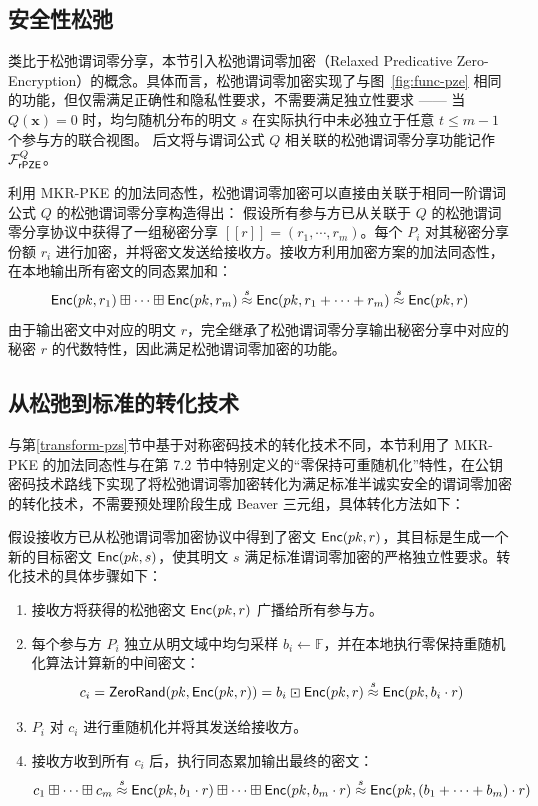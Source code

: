 \subsection{安全性松弛}

类比于松弛谓词零分享，本节引入松弛谓词零加密（Relaxed Predicative Zero-Encryption）的概念。具体而言，松弛谓词零加密实现了与图~\ref{fig:func-pze} 相同的功能，但仅需满足正确性和隐私性要求，不需要满足独立性要求 —— 当 $Q(\textbf{x}) = 0$ 时，均匀随机分布的明文 $s$ 在实际执行中未必独立于任意 $t \le m-1$ 个参与方的联合视图。
后文将与谓词公式 $Q$ 相关联的松弛谓词零分享功能记作 $\mathcal{F}_\mathsf{rPZE}^Q$。

利用 MKR-PKE 的加法同态性，松弛谓词零加密可以直接由关联于相同一阶谓词公式 $Q$ 的松弛谓词零分享构造得出：
假设所有参与方已从关联于 $Q$ 的松弛谓词零分享协议中获得了一组秘密分享 $[\! [ r ] \!] = (r_1, \cdots, r_m)$。每个 $P_i$ 对其秘密分享份额 $r_i$ 进行加密，并将密文发送给接收方。接收方利用加密方案的加法同态性，在本地输出所有密文的同态累加和： 
\begin{equation*}
    \mathsf{Enc}(pk,r_1) \boxplus \cdots \boxplus \mathsf{Enc}(pk,r_m) \overset{s}{\approx} \mathsf{Enc}(pk, r_1 + \cdots + r_m) \overset{s}{\approx} \mathsf{Enc}(pk,r)
\end{equation*}
由于输出密文中对应的明文 $r$，完全继承了松弛谓词零分享输出秘密分享中对应的秘密 $r$ 的代数特性，因此满足松弛谓词零加密的功能。

\subsection{从松弛到标准的转化技术}

与第\ref{transform-pzs}节中基于对称密码技术的转化技术不同，本节利用了 MKR-PKE 的加法同态性与在第 7.2 节中特别定义的“零保持可重随机化”特性，在公钥密码技术路线下实现了将松弛谓词零加密转化为满足标准半诚实安全的谓词零加密的转化技术，不需要预处理阶段生成 Beaver 三元组，具体转化方法如下：

假设接收方已从松弛谓词零加密协议中得到了密文 $\mathsf{Enc}(pk,r)$，其目标是生成一个新的目标密文 $\mathsf{Enc}(pk,s)$，使其明文 $s$ 满足标准谓词零加密的严格独立性要求。转化技术的具体步骤如下：
\begin{enumerate}
    \item 接收方将获得的松弛密文 $\mathsf{Enc}(pk,r)$ 广播给所有参与方。
    \item 每个参与方 $P_i$ 独立从明文域中均匀采样 $b_i \gets \mathbb{F}$，并在本地执行零保持重随机化算法计算新的中间密文：
    $$c_i = \mathsf{ZeroRand}(pk,\mathsf{Enc}(pk,r)) = b_i \boxdot \mathsf{Enc}(pk,r) \overset{s}{\approx} \mathsf{Enc}(pk, b_i \cdot r)$$
    \item $P_i$ 对 $c_i$ 进行重随机化并将其发送给接收方。
    \item 接收方收到所有 $c_i$ 后，执行同态累加输出最终的密文：
    $$c_1 \boxplus \cdots \boxplus c_m \overset{s}{\approx} \mathsf{Enc}(pk, b_1 \cdot r) \boxplus \cdots \boxplus \mathsf{Enc}(pk, b_m \cdot r) \overset{s}{\approx} \mathsf{Enc}(pk, (b_1 + \cdots + b_m) \cdot r)$$
\end{enumerate}

